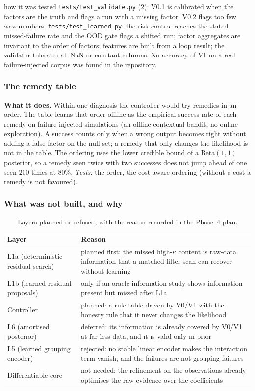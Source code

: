 \begin{explained}{how it was tested}
\texttt{tests/test\_validate.py} ($2$): V0.1 is calibrated when the factors are the truth and flags a run with a missing factor; V0.2 flags too few wavenumbers. \texttt{tests/test\_learned.py}: the risk control reaches the stated missed-failure rate and the OOD gate flags a shifted run; factor aggregates are invariant to the order of factors; features are built from a loop result; the validator tolerates all-NaN or constant columns. No accuracy of V1 on a real failure-injected corpus was found in the repository.
\end{explained}

\subsubsection{The remedy table}
\textbf{What it does.} Within one diagnosis the controller would try remedies in an order. The table learns that order offline as the empirical success rate of each remedy on failure-injected simulations (an offline contextual bandit, no online exploration). A success counts only when a wrong output becomes right without adding a false factor on the null set; a remedy that only changes the likelihood is not in the table. The ordering uses the lower credible bound of a Beta$(1,1)$ posterior, so a remedy seen twice with two successes does not jump ahead of one seen $200$ times at $80\%$. \emph{Tests:} the order, the cost-aware ordering (without a cost a remedy is not favoured).

\subsubsection{What was not built, and why}
\begin{table}[!htb]
\centering\small
\begin{tabular}{@{}L{3.0cm}L{9.0cm}@{}}
\toprule
Layer & Reason \\\midrule
L1a (deterministic residual search) & planned first: the missed high-$\kappa$ content is raw-data information that a matched-filter scan can recover without learning\\
L1b (learned residual proposals) & only if an oracle information study shows information present but missed after L1a\\
Controller & planned: a rule table driven by V0/V1 with the honesty rule that it never changes the likelihood\\
L6 (amortised posterior) & deferred: its information is already covered by V0/V1 at far less data, and it is valid only in-prior\\
L5 (learned grouping encoder) & rejected: no stable linear encoder makes the interaction term vanish, and the failures are not grouping failures\\
Differentiable core & not needed: the refinement on the observations already optimises the raw evidence over the coefficients\\
\bottomrule
\end{tabular}
\caption{Layers planned or refused, with the reason recorded in the Phase~4 plan.}
\end{table}

